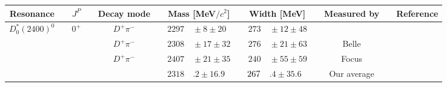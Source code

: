 \begin{adjustbox}{width=0.76\textwidth,center}
{\setlength\tabcolsep{0pt}
	\begin{tabular}{cp{5pt}cp{5pt}cp{5pt}r@{}lp{5pt}r@{}lp{5pt}cp{5pt}c}
		\toprule
		\rowcolor{Gray} Resonance	&&	$J^{P}$	&&	Decay mode	&&	\multicolumn{2}{c}{Mass [MeV$/c^{2}$]}	& &	\multicolumn{2}{c}{Width [MeV]}	& &	\multicolumn{1}{c}{Measured by}	&&	\multicolumn{1}{c}{Reference}
		\\ \midrule												
		\multirow{4}{*}{$D_{0}^{*}(2400)^{0}$}   &                  & \multirow{4}{*}{$0^{+}$}     &                  & $D^{+}\pi^{-}$                  &                       & $	2297$                       & ${}\pm8\pm20	$                                &                       & $	273$                                           & ${}\pm12\pm48	$                              &                       & \babar{}                                                      &                       & \cite{Aubert:2009wg}                      \\
		                                         &                  &                              &                  & $D^{+}\pi^{-}$                  &                       & $	2308$                       & ${}\pm17\pm32	$                               &                       & $	276$                                           & ${}\pm21\pm63	$                              &                       & Belle                                                         &                       & \cite{Abe:2003zm}                         \\
		                                         &                  &                              &                  & $D^{+}\pi^{-}$                  &                       & $	2407$                       & ${} \pm 21 \pm 35	$                           &                       & $	240$                                           & ${}\pm55 \pm 59	$                            &                       & Focus                                                         &                       & \cite{Link:2003bd}                        \\ \cmidrule{6-14}
		                                         &                  &                              &                  &                                 & \cellcolor{Gray}      & \cellcolor{Gray}$2318$        & \cellcolor{Gray}$.2 \pm 16.9	$                & \cellcolor{Gray}      & $	\cellcolor{Gray} 267$                          & \cellcolor{Gray}$.4 \pm 35.6	$               & \cellcolor{Gray}      & \cellcolor{Gray} Our average                                  & \cellcolor{Gray}      &                                           \\ \midrule

\end{tabular}}
\end{adjustbox}
